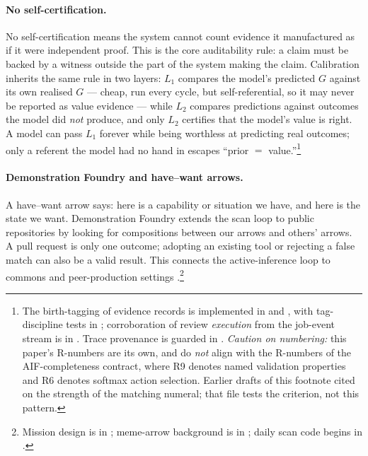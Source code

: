 \paragraph{No self-certification.} No self-certification means the system cannot count evidence it manufactured as if it were independent proof.  This is the core auditability rule: a claim must be backed by a witness outside the part of the system making the claim.  Calibration inherits the same rule in two layers: $L_1$ compares the model's predicted $G$ against its own realised $G$ --- cheap, run every cycle, but self-referential, so it may never be reported as value evidence --- while $L_2$ compares predictions against outcomes the model did \emph{not} produce, and only $L_2$ certifies that the model's value is right.  A model can pass $L_1$ forever while being worthless at predicting real outcomes; only a referent the model had no hand in escapes ``prior $=$ value.''\footnote{The birth-tagging of evidence records is implemented in  and , with tag-discipline tests in ; corroboration of review \emph{execution} from the job-event stream is in . Trace provenance is guarded in . \emph{Caution on numbering:} this paper's R-numbers are its own, and do \emph{not} align with the R-numbers of the  AIF-completeness contract, where R9 denotes named validation properties and R6 denotes softmax action selection. Earlier drafts of this footnote cited  on the strength of the matching numeral; that file tests the  criterion, not this pattern.}

\paragraph{Demonstration Foundry and have--want arrows.} A have--want arrow says: here is a capability or situation we have, and here is the state we want.  Demonstration Foundry extends the scan loop to public repositories by looking for compositions between our arrows and others' arrows.  A pull request is only one outcome; adopting an existing tool or rejecting a false match can also be a valid result.  This connects the active-inference loop to commons and peer-production settings \cite{benkler2006wealth,wenger1998communities}.\footnote{Mission design is in ; meme-arrow background is in ; daily scan code begins in .}

